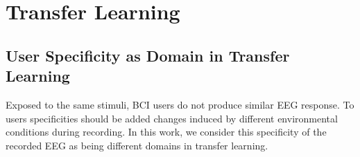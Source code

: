 


%
 
\section{Transfer Learning}
\label{sec:transfer-learn}

\subsection{User Specificity as Domain in Transfer Learning}
\label{subsec:transfer-learning-definition}

Exposed to the same stimuli, BCI users do not produce similar EEG response. To users specificities should be added changes induced by different environmental conditions during recording. 
In this work, we consider this specificity of the recorded EEG as being different domains in transfer learning. 

